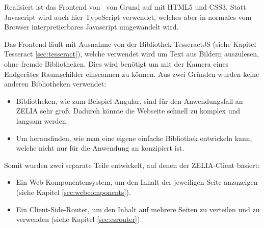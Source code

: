 Realisiert ist das Frontend von \ZELIA\ von Grund auf mit HTML5 und CSS3. Statt Javascript wird auch hier TypeScript verwendet, welches aber in normales vom Browser interpretierbares Javascript umgewandelt wird. 

Das Frontend läuft mit Ausnahme von der Bibliothek TesseractJS (siehe Kapitel Tesseract \ref{sec:tesseract}), welche verwendet wird um Text aus Bildern auszulesen, ohne fremde Bibliotheken. Dies wird benötigt um mit der Kamera eines Endgerätes Raumschilder einscannen zu können. Aus zwei Gründen wurden keine anderen Bibliotheken verwendet:
\begin{itemize}
    \item Bibliotheken, wie zum Beispiel Angular, sind für den Anwendungsfall an ZELIA sehr groß. Dadurch könnte die Webseite schnell zu komplex und langsam werden.
    \item Um herausfinden, wie man eine eigene einfache Bibliothek entwickeln kann, welche nicht nur für die Anwendung an \ZELIA konzipiert ist.
\end{itemize}

Somit wurden zwei separate Teile entwickelt, auf denen der ZELIA-Client basiert:

\begin{itemize}
    \item Ein Web-Komponentensystem, um den Inhalt der jeweiligen Seite anzuzeigen (siehe Kapitel \ref{sec:webcomponents}).
    \item Ein Client-Side-Router, um den Inhalt auf mehrere Seiten zu verteilen und zu verwenden (siehe Kapitel \ref{sec:csrouter}).
\end{itemize}
